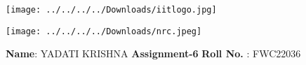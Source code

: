 \documentclass[10pt,a4paper]{report}
\begin{document}
\begin{figure*}[!tbp]
  \centering
  \begin{minipage}[b]{0.4\textwidth}
\texttt{[image: ../../../../Downloads/iitlogo.jpg]} 
  \end{minipage}
  \hfill
  \vspace{5mm}\begin{minipage}[b]{0.4\textwidth}
\raggedleft \texttt{[image: ../../../../Downloads/nrc.jpeg]} 

  \end{minipage}\vspace{0.2cm}
\end{figure*}
\raggedright \textbf{Name}:\hspace{1mm} YADATI KRISHNA\hspace{3cm} \Large \textbf{Assignment-6}\hspace{2.5cm} %
\normalsize \textbf{Roll No.} :\hspace{1mm} FWC22036\vspace{1cm}
\end{document}
